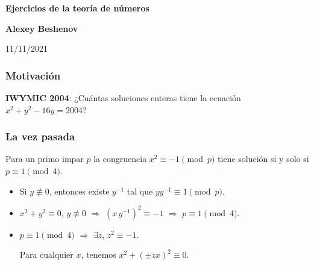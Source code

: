 \documentclass[handout]{beamer}
\begin{document}

\begin{frame}[noframenumbering]
  \begin{center}
    {\LARGE\bf Ejercicios de la teoría de números

    }

    \vspace{3em}

    {\large\bf Alexey Beshenov}

    \vspace{4em}

    11/11/2021

  \end{center}
\end{frame}


\begin{frame}[fragile]
  \frametitle{Motivación}

  \begin{shaded}
    \textbf{IWYMIC 2004}: ¿Cuántas soluciones enteras tiene la ecuación
    $x^2 + y^2 - 16y = 2004$?
  \end{shaded}
\end{frame}


\begin{frame}[fragile]
  \frametitle{La vez pasada}

  \begin{shaded}
    Para un primo impar $p$ la congruencia $x^2 \equiv -1 \pmod{p}$ tiene
    solución si y solo si $p \equiv 1 \pmod{4}$.
  \end{shaded}


  \vspace{\fill}

  \ifdefined\solutions

  \begin{itemize}
  \item<4-> Si $y \not\equiv 0$, entonces existe $y^{-1}$ tal que
    $y y^{-1} \equiv 1 \pmod{p}$.

  \item<5-> $x^2 + y^2 \equiv 0$, $y \not\equiv 0$ $\Longrightarrow$
    $(x\,y^{-1})^2 \equiv -1$ $\Longrightarrow$ $p \equiv 1 \pmod{4}$.

  \item<6-> $p \equiv 1 \pmod{4}$ $\Longrightarrow$ $\exists z$, $z^2 \equiv -1$.

    Para cualquier $x$, tenemos $x^2 + (\pm zx)^2 \equiv 0$.
  \end{itemize}
  \fi
\end{frame}
\end{document}
